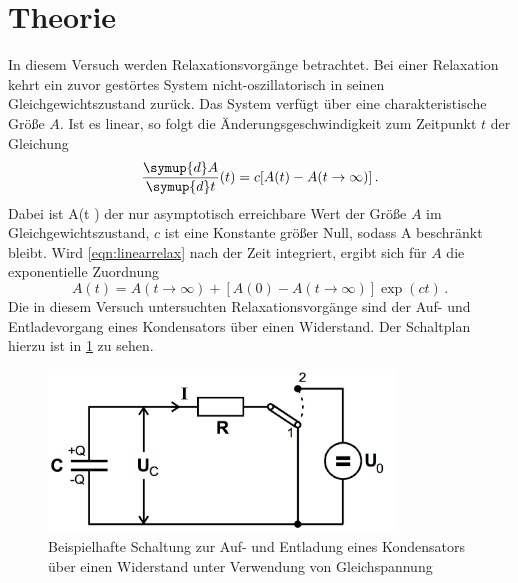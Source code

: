\section{Theorie}
In diesem Versuch werden Relaxationsvorgänge betrachtet. Bei einer Relaxation kehrt
ein zuvor gestörtes System nicht-oszillatorisch in seinen Gleichgewichtszustand
zurück. Das System verfügt über eine charakteristische Größe $A$. Ist es linear,
so folgt die Änderungsgeschwindigkeit zum Zeitpunkt $t$ der Gleichung
\begin{equation}
  \frac{\symup{d}A}{\symup{d}t}(t) = c[A(t)-A(t \to \infty)]\,.
  \label{eqn:linearrelax}
\end{equation}
Dabei ist A(t \to \infty) der nur asymptotisch erreichbare Wert der Größe $A$ im
Gleichgewichtszustand, $c$ ist eine Konstante größer Null, sodass A beschränkt
bleibt.
Wird \eqref{eqn:linearrelax} nach der Zeit integriert, ergibt sich für $A$ die
exponentielle Zuordnung
\begin{equation}
  A(t) = A(t \to \infty) + [A(0) - A(t \to \infty)] \exp(ct)\,.
\end{equation}
Die in diesem Versuch untersuchten Relaxationsvorgänge sind der Auf- und Entladevorgang
eines Kondensators über einen Widerstand. Der Schaltplan hierzu ist in \ref{fig:Aufbau_1} zu sehen.
\begin{figure}
  \centering
  \includegraphics[width=260pt]{aufbau_1.png}
  \caption{Beispielhafte Schaltung zur Auf- und Entladung eines Kondensators über einen
  Widerstand unter Verwendung von Gleichspannung \cite{Versuchsanleitung}}
  \label{fig:Aufbau_1}
\end{figure}


